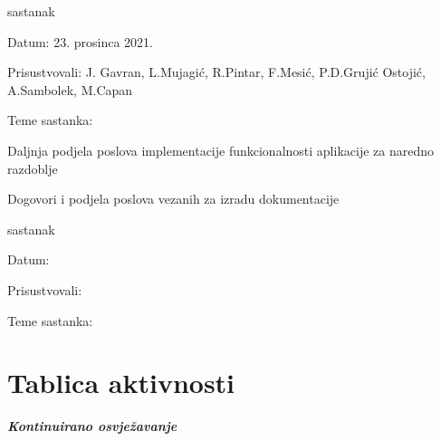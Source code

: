 \begin{packed_enum}
    		\item sastanak
    	\item[] \begin{packed_item}
    		\item Datum: 23. prosinca 2021.
    		\item Prisustvovali: J. Gavran, L.Mujagić, R.Pintar, F.Mesić, P.D.Grujić Ostojić, A.Sambolek, M.Capan
    		\item Teme sastanka:
    		\begin{packed_item}
    			\item Daljnja podjela poslova implementacije funkcionalnosti aplikacije za naredno razdoblje
    			\item Dogovori i podjela poslova vezanih za izradu dokumentacije
    		\end{packed_item}
    	\end{packed_item}
    
    		\item sastanak
    	\item[] \begin{packed_item}
    		\item Datum: 
    		\item Prisustvovali:
    		\item Teme sastanka:
    		\begin{packed_item}
    			\item 
    			\item 
    		\end{packed_item}
    	\end{packed_item}

		\end{packed_enum}	
		
		\eject
		\section*{Tablica aktivnosti}
		
			\textbf{\textit{Kontinuirano osvježavanje}}\\
			
